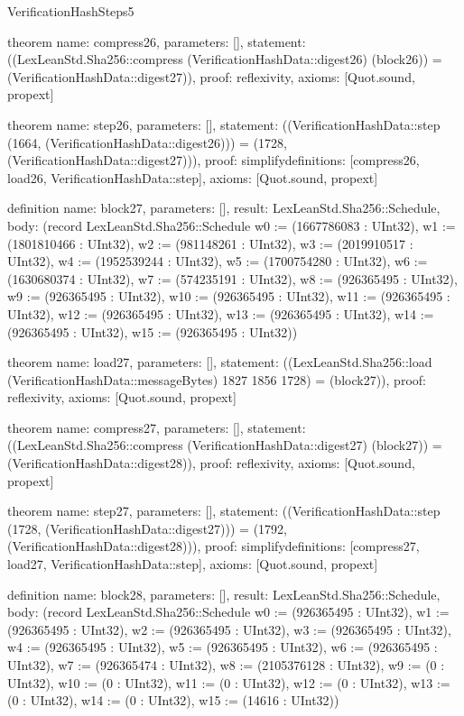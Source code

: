 \begin{lexlean}{VerificationHashSteps5}
\begin{semanticmodule}
theorem{
  name: compress26,
  parameters: [],
  statement: ((LexLeanStd.Sha256::compress (VerificationHashData::digest26) (block26)) = (VerificationHashData::digest27)),
  proof: reflexivity{},
  axioms: [Quot.sound, propext]
}

theorem{
  name: step26,
  parameters: [],
  statement: ((VerificationHashData::step (1664, (VerificationHashData::digest26))) = (1728, (VerificationHashData::digest27))),
  proof: simplify{definitions: [compress26, load26, VerificationHashData::step]},
  axioms: [Quot.sound, propext]
}

definition{
  name: block27,
  parameters: [],
  result: LexLeanStd.Sha256::Schedule,
  body: (record LexLeanStd.Sha256::Schedule {w0 := (1667786083 : UInt32), w1 := (1801810466 : UInt32), w2 := (981148261 : UInt32), w3 := (2019910517 : UInt32), w4 := (1952539244 : UInt32), w5 := (1700754280 : UInt32), w6 := (1630680374 : UInt32), w7 := (574235191 : UInt32), w8 := (926365495 : UInt32), w9 := (926365495 : UInt32), w10 := (926365495 : UInt32), w11 := (926365495 : UInt32), w12 := (926365495 : UInt32), w13 := (926365495 : UInt32), w14 := (926365495 : UInt32), w15 := (926365495 : UInt32)})
}

theorem{
  name: load27,
  parameters: [],
  statement: ((LexLeanStd.Sha256::load (VerificationHashData::messageBytes) 1827 1856 1728) = (block27)),
  proof: reflexivity{},
  axioms: [Quot.sound, propext]
}

theorem{
  name: compress27,
  parameters: [],
  statement: ((LexLeanStd.Sha256::compress (VerificationHashData::digest27) (block27)) = (VerificationHashData::digest28)),
  proof: reflexivity{},
  axioms: [Quot.sound, propext]
}

theorem{
  name: step27,
  parameters: [],
  statement: ((VerificationHashData::step (1728, (VerificationHashData::digest27))) = (1792, (VerificationHashData::digest28))),
  proof: simplify{definitions: [compress27, load27, VerificationHashData::step]},
  axioms: [Quot.sound, propext]
}

definition{
  name: block28,
  parameters: [],
  result: LexLeanStd.Sha256::Schedule,
  body: (record LexLeanStd.Sha256::Schedule {w0 := (926365495 : UInt32), w1 := (926365495 : UInt32), w2 := (926365495 : UInt32), w3 := (926365495 : UInt32), w4 := (926365495 : UInt32), w5 := (926365495 : UInt32), w6 := (926365495 : UInt32), w7 := (926365474 : UInt32), w8 := (2105376128 : UInt32), w9 := (0 : UInt32), w10 := (0 : UInt32), w11 := (0 : UInt32), w12 := (0 : UInt32), w13 := (0 : UInt32), w14 := (0 : UInt32), w15 := (14616 : UInt32)})
}


\end{semanticmodule}
\end{lexlean}
